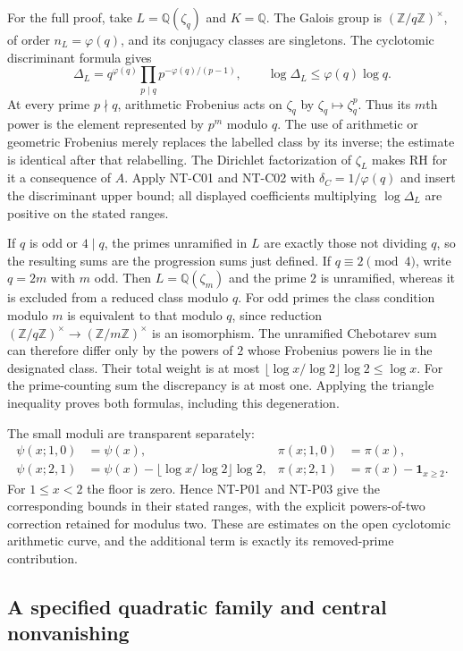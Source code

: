 For the full proof, take $L=\mathbb Q(\zeta_q)$ and $K=\mathbb Q$.
The Galois group is $(\mathbb Z/q\mathbb Z)^\times$, of order
$n_L=\varphi(q)$, and its conjugacy classes are singletons.
The cyclotomic discriminant formula gives
\[
 \Delta_L=q^{\varphi(q)}
    \prod_{p\mid q}p^{-\varphi(q)/(p-1)},\qquad
 \log\Delta_L\le\varphi(q)\log q.
\]
At every prime $p\nmid q$, arithmetic Frobenius acts on $\zeta_q$ by
$\zeta_q\mapsto\zeta_q^p$.  Thus its $m$th power is the element
represented by $p^m$ modulo $q$.  The use of arithmetic or geometric
Frobenius merely replaces the labelled class by its inverse; the estimate
is identical after that relabelling.  The Dirichlet factorization of
$\zeta_L$ makes RH for it a consequence of $A$.
Apply NT-C01 and NT-C02 with $\delta_C=1/\varphi(q)$ and insert the
discriminant upper bound; all displayed coefficients multiplying
$\log\Delta_L$ are positive on the stated ranges.

If $q$ is odd or $4\mid q$, the primes unramified in $L$ are exactly
those not dividing $q$, so the resulting sums are the progression sums
just defined.  If $q\equiv2\pmod4$, write $q=2m$ with $m$ odd.
Then $L=\mathbb Q(\zeta_m)$ and the prime $2$ is unramified, whereas it
is excluded from a reduced class modulo $q$.  For odd primes the class
condition modulo $m$ is equivalent to that modulo $q$, since reduction
$(\mathbb Z/q\mathbb Z)^\times\to(\mathbb Z/m\mathbb Z)^\times$ is
an isomorphism.  The unramified Chebotarev sum can therefore differ only
by the powers of $2$ whose Frobenius powers lie in the designated class.
Their total weight is at most
$\lfloor\log x/\log2\rfloor\log2\le\log x$.
For the prime-counting sum the discrepancy is at most one.  Applying the
triangle inequality proves both formulas, including this degeneration.

The small moduli are transparent separately:
\begin{align*}
 \psi(x;1,0)&=\psi(x),& \pi(x;1,0)&=\pi(x),\\
 \psi(x;2,1)&=\psi(x)-\lfloor\log x/\log2\rfloor\log2,&
 \pi(x;2,1)&=\pi(x)-\mathbf1_{x\ge2}.
\end{align*}
For $1\le x<2$ the floor is zero.  Hence NT-P01 and NT-P03 give the
corresponding bounds in their stated ranges, with the explicit powers-of-two
correction retained for modulus two.  These are estimates on the open
cyclotomic arithmetic curve, and the additional term is exactly its
removed-prime contribution.

\subsection{A specified quadratic family and central nonvanishing}

